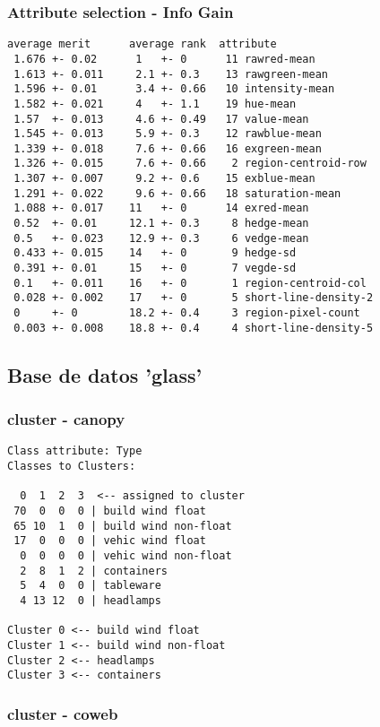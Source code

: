 \documentclass[a4paper]{article}
\begin{document}
\subsubsection{Attribute selection - Info Gain}

\begin{verbatim}
average merit      average rank  attribute
 1.676 +- 0.02      1   +- 0      11 rawred-mean
 1.613 +- 0.011     2.1 +- 0.3    13 rawgreen-mean
 1.596 +- 0.01      3.4 +- 0.66   10 intensity-mean
 1.582 +- 0.021     4   +- 1.1    19 hue-mean
 1.57  +- 0.013     4.6 +- 0.49   17 value-mean
 1.545 +- 0.013     5.9 +- 0.3    12 rawblue-mean
 1.339 +- 0.018     7.6 +- 0.66   16 exgreen-mean
 1.326 +- 0.015     7.6 +- 0.66    2 region-centroid-row
 1.307 +- 0.007     9.2 +- 0.6    15 exblue-mean
 1.291 +- 0.022     9.6 +- 0.66   18 saturation-mean
 1.088 +- 0.017    11   +- 0      14 exred-mean
 0.52  +- 0.01     12.1 +- 0.3     8 hedge-mean
 0.5   +- 0.023    12.9 +- 0.3     6 vedge-mean
 0.433 +- 0.015    14   +- 0       9 hedge-sd
 0.391 +- 0.01     15   +- 0       7 vegde-sd
 0.1   +- 0.011    16   +- 0       1 region-centroid-col
 0.028 +- 0.002    17   +- 0       5 short-line-density-2
 0     +- 0        18.2 +- 0.4     3 region-pixel-count
 0.003 +- 0.008    18.8 +- 0.4     4 short-line-density-5

\end{verbatim}

\subsection{Base de datos 'glass'}

\subsubsection{cluster - canopy}

\begin{verbatim}
Class attribute: Type
Classes to Clusters:

  0  1  2  3  <-- assigned to cluster
 70  0  0  0 | build wind float
 65 10  1  0 | build wind non-float
 17  0  0  0 | vehic wind float
  0  0  0  0 | vehic wind non-float
  2  8  1  2 | containers
  5  4  0  0 | tableware
  4 13 12  0 | headlamps

Cluster 0 <-- build wind float
Cluster 1 <-- build wind non-float
Cluster 2 <-- headlamps
Cluster 3 <-- containers
\end{verbatim}

\subsubsection{cluster - coweb}
\end{document}
